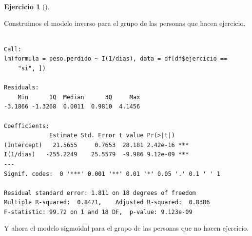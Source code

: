 \documentclass[
  spanish,
  a4paper,
]{scrreport}
\newenvironment{Shaded}{\begin{snugshade}}{\end{snugshade}}
\newcommand{\DecValTok}[1]{\textcolor[rgb]{0.68,0.00,0.00}{#1}}
\newcommand{\FunctionTok}[1]{\textcolor[rgb]{0.28,0.35,0.67}{#1}}
\newcommand{\NormalTok}[1]{\textcolor[rgb]{0.00,0.23,0.31}{#1}}
\newcommand{\OtherTok}[1]{\textcolor[rgb]{0.00,0.23,0.31}{#1}}
\newcommand{\SpecialCharTok}[1]{\textcolor[rgb]{0.37,0.37,0.37}{#1}}
\newcommand{\StringTok}[1]{\textcolor[rgb]{0.13,0.47,0.30}{#1}}
\theoremstyle{definition}
\newtheorem{exercise}{Ejercicio}[chapter]
\theoremstyle{remark}
\begin{document}
\begin{exercise}[]
\begin{enumerate}
  \begin{tcolorbox}[enhanced jigsaw, arc=.35mm, bottomrule=.15mm, bottomtitle=1mm, breakable, colback=white, colbacktitle=quarto-callout-tip-color!10!white, colframe=quarto-callout-tip-color-frame, coltitle=black, left=2mm, leftrule=.75mm, opacityback=0, opacitybacktitle=0.6, rightrule=.15mm, title=\textcolor{quarto-callout-tip-color}{\faLightbulb}\hspace{0.5em}{Solución}, titlerule=0mm, toprule=.15mm, toptitle=1mm]

  Construimos el modelo inverso para el grupo de las personas que hacen
  ejercicio.

\begin{Shaded}
\end{Shaded}

\begin{verbatim}

Call:
lm(formula = peso.perdido ~ I(1/dias), data = df[df$ejercicio == 
    "si", ])

Residuals:
    Min      1Q  Median      3Q     Max 
-3.1866 -1.3268  0.0011  0.9810  4.1456 

Coefficients:
             Estimate Std. Error t value Pr(>|t|)    
(Intercept)   21.5655     0.7653  28.181 2.42e-16 ***
I(1/dias)   -255.2249    25.5579  -9.986 9.12e-09 ***
---
Signif. codes:  0 '***' 0.001 '**' 0.01 '*' 0.05 '.' 0.1 ' ' 1

Residual standard error: 1.811 on 18 degrees of freedom
Multiple R-squared:  0.8471,    Adjusted R-squared:  0.8386 
F-statistic: 99.72 on 1 and 18 DF,  p-value: 9.123e-09
\end{verbatim}

  Y ahora el modelo sigmoidal para el grupo de las personas que no hacen
  ejercicio.

\begin{Shaded}
\end{Shaded}


\end{tcolorbox}
\end{enumerate}
\end{exercise}
\end{document}
